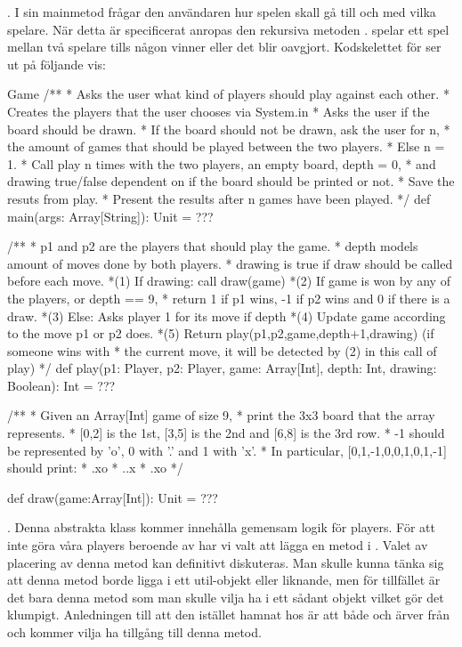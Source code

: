 . I sin mainmetod frågar den användaren hur spelen skall gå till och med vilka spelare.
När detta är specificerat anropas den rekursiva metoden .
 spelar ett spel mellan två spelare tills någon vinner eller det blir oavgjort.
Kodskelettet för  ser ut på följande vis:
\begin{ScalaSpec}{Game}
/** 
 * Asks the user what kind of players should play against each other.
 * Creates the players that the user chooses via System.in 
 * Asks the user if the board should be drawn.
 * If the board should not be drawn, ask the user for n,
 * the amount of games that should be played between the two players.
 * Else n = 1.
 * Call play n times with the two players, an empty board, depth = 0,
 * and drawing true/false dependent on if the board should be printed or not. 
 * Save the resuts from play. 
 * Present the results after n games have been played. 
 */
def main(args: Array[String]): Unit = ???

/**
 * p1 and p2 are the players that should play the game.
 * depth models amount of moves done by both players.
 * drawing is true if draw should be called before each move.
 *(1) If drawing: call draw(game)
 *(2) If game is won by any of the players, or depth == 9, 
 * return 1 if p1 wins, -1 if p2 wins and 0 if there is a draw.
 *(3) Else: Asks player 1 for its move if depth%
 *(4) Update game according to the move p1 or p2 does.
 *(5) Return play(p1,p2,game,depth+1,drawing) (if someone wins with
 * the current move, it will be detected by (2) in this call of play)
 */
def play(p1: Player, p2: Player, game: Array[Int], 
         depth: Int, drawing: Boolean): Int = ???

/**
 * Given an Array[Int] game of size 9, 
 * print the 3x3 board that the array represents. 
 * [0,2] is the 1st, [3,5] is the 2nd and [6,8] is the 3rd row.
 * -1 should be represented by 'o', 0 with '.' and 1 with 'x'.
 * In particular, [0,1,-1,0,0,1,0,1,-1] should print:
 * .xo
 * ..x
 * .xo
 */

def draw(game:Array[Int]): Unit = ???
\end{ScalaSpec}

. Denna abstrakta klass kommer innehålla gemensam logik för players. För att inte göra våra players beroende av har vi valt att lägga en metod  i . Valet av placering av denna metod kan definitivt diskuteras. Man skulle kunna tänka sig att denna metod borde ligga i ett util-objekt eller liknande, men för tillfället är det bara denna metod som man skulle vilja ha i ett sådant objekt vilket gör det klumpigt. Anledningen till att den istället hamnat hos  är att både  och  ärver från  och kommer vilja ha tillgång till denna metod.

